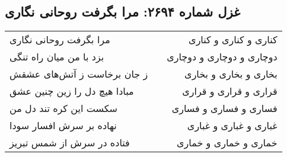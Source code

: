 \begin{center}
\section*{غزل شماره ۲۶۹۴: مرا بگرفت روحانی نگاری}
\label{sec:2694}
\begin{longtable}{l p{0.5cm} r}
مرا بگرفت روحانی نگاری
&&
کناری و کناری و کناری
\\
بزد با من میان راه تنگی
&&
دوچاری و دوچاری و دوچاری
\\
ز جان برخاست ز آتش‌های عشقش
&&
بخاری و بخاری و بخاری
\\
مبادا هیچ دل را زین چنین عشق
&&
قراری و قراری و قراری
\\
سکست این کره تند دل من
&&
فساری و فساری و فساری
\\
نهاده بر سرش افسار سودا
&&
غباری و غباری و غباری
\\
فتاده در سرش از شمس تبریز
&&
خماری و خماری و خماری
\\
\end{longtable}
\end{center}
